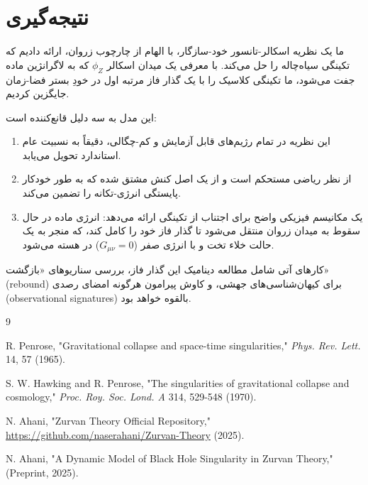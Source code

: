 \documentclass[12pt, a4paper]{article}
\newcommand{\phiZ}{\phi_Z}
\begin{document}
\section{نتیجه‌گیری}

ما یک نظریه اسکالر-تانسور خود-سازگار، با الهام از چارچوب زروان، ارائه دادیم که تکینگی سیاه‌چاله را حل می‌کند. با معرفی یک میدان اسکالر $\phiZ$ که به لاگرانژین ماده جفت می‌شود، ما تکینگی کلاسیک را با یک گذار فاز مرتبه اول در خودِ بستر فضا-زمان جایگزین کردیم.

این مدل به سه دلیل قانع‌کننده است:
\begin{enumerate}
    \item این نظریه در تمام رژیم‌های قابل آزمایش و کم-چگالی، دقیقاً به نسبیت عام استاندارد تحویل می‌یابد.
    \item از نظر ریاضی مستحکم است و از یک اصل کنش مشتق شده که به طور خودکار پایستگی انرژی-تکانه را تضمین می‌کند.
    \item یک مکانیسم فیزیکی واضح برای اجتناب از تکینگی ارائه می‌دهد: انرژی ماده در حال سقوط به میدان زروان منتقل می‌شود تا گذار فاز خود را کامل کند، که منجر به یک حالت خلاء تخت و با انرژی صفر ($G_{\mu\nu}=0$) در هسته می‌شود.
\end{enumerate}

کارهای آتی شامل مطالعه دینامیک این گذار فاز، بررسی سناریوهای «بازگشت» (rebound) برای کیهان‌شناسی‌های جهشی، و کاوش پیرامون هرگونه امضای رصدی (observational signatures) بالقوه خواهد بود.


\begin{thebibliography}{9}

R. Penrose, "Gravitational collapse and space-time singularities," \textit{Phys. Rev. Lett.} 14, 57 (1965).

S. W. Hawking and R. Penrose, "The singularities of gravitational collapse and cosmology," \textit{Proc. Roy. Soc. Lond. A} 314, 529-548 (1970).

N. Ahani, "Zurvan Theory Official Repository," \url{https://github.com/naserahani/Zurvan-Theory} (2025).

N. Ahani, "A Dynamic Model of Black Hole Singularity in Zurvan Theory," (Preprint, 2025).

\end{thebibliography}

\end{document}
